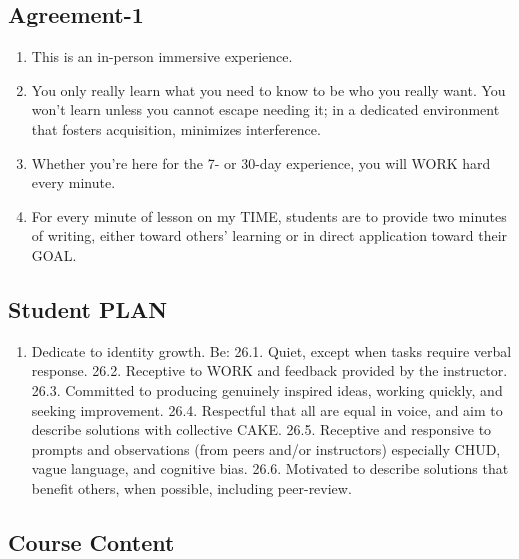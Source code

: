 \documentclass[
]{book}
\providecommand{\tightlist}{%
  \setlength{\itemsep}{0pt}\setlength{\parskip}{0pt}}
\begin{document}
\hypertarget{agreement-1}{%
\subsection{Agreement-1}\label{agreement-1}}

\begin{enumerate}
\def\labelenumi{\arabic{enumi}.}
\setcounter{enumi}{21}
\tightlist
\item
  This is an in-person immersive experience.
\item
  You only really learn what you need to know to be who you really want. You
  won't learn unless you cannot escape needing it; in a dedicated environment
  that fosters acquisition, minimizes interference.
\item
  Whether you're here for the 7- or 30-day experience, you will WORK hard every
  minute.
\item
  For every minute of lesson on my TIME, students are to provide two minutes of
  writing, either toward others' learning or in direct application toward their GOAL.
\end{enumerate}

\hypertarget{student-plan}{%
\subsection{Student PLAN}\label{student-plan}}

\begin{enumerate}
\def\labelenumi{\arabic{enumi}.}
\setcounter{enumi}{25}
\tightlist
\item
  Dedicate to identity growth. Be:
  26.1. Quiet, except when tasks require verbal response.
  26.2. Receptive to WORK and feedback provided by the instructor.
  26.3. Committed to producing genuinely inspired ideas, working quickly, and seeking improvement.
  26.4. Respectful that all are equal in voice, and aim to describe solutions with collective CAKE.
  26.5. Receptive and responsive to prompts and observations (from peers and/or
  instructors) especially CHUD, vague language, and cognitive bias.
  26.6. Motivated to describe solutions that benefit others, when possible,
  including peer-review.
\end{enumerate}

\hypertarget{course-content}{%
\subsection{Course Content}\label{course-content}}
\end{document}
